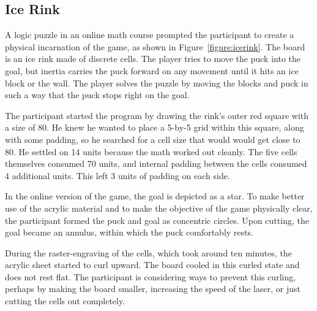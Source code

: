 \subsection{Ice Rink}

A logic puzzle in an online math course prompted the participant to create a physical incarnation of the game, as shown in Figure~\ref{figure:icerink}. The board is an ice rink made of discrete cells. The player tries to move the puck into the goal, but inertia carries the puck forward on any movement until it hits an ice block or the wall. The player solves the puzzle by moving the blocks and puck in such a way that the puck stops right on the goal.

The participant started the program by drawing the rink's outer red square with a size of 80. He knew he wanted to place a 5-by-5 grid within this square, along with some padding, so he searched for a cell size that would would get close to 80. He settled on 14 units because the math worked out cleanly. The five cells themselves consumed 70 units, and internal padding between the cells consumed 4 additional units. This left 3 units of padding on each side.

In the online version of the game, the goal is depicted as a star. To make better use of the acrylic material and to make the objective of the game physically clear, the participant formed the puck and goal as concentric circles. Upon cutting, the goal became an annulus, within which the puck comfortably rests.

During the raster-engraving of the cells, which took around ten minutes, the acrylic sheet started to curl upward. The board cooled in this curled state and does not rest flat. The participant is considering ways to prevent this curling, perhaps by making the board smaller, increasing the speed of the laser, or just cutting the cells out completely.

